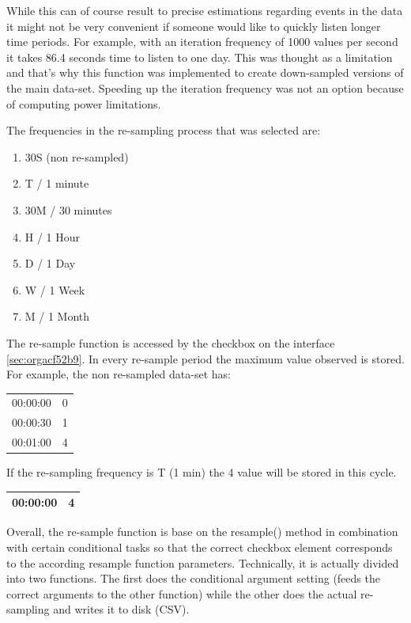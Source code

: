 \documentclass[11pt]{article}
\begin{document}
While this can of course result to precise estimations regarding events in the data it might not be very convenient if someone would like to quickly listen longer time periods.  For example, with an iteration frequency of 1000 values per second it takes 86.4 seconds time to listen to one day.  This was thought as a limitation and that's why this function was implemented to create down-sampled versions of the main data-set.  Speeding up the iteration frequency was not an option because of computing power limitations.

The frequencies in the re-sampling process that was selected are:
\begin{enumerate}
\item 30S (non re-sampled)
\item T / 1 minute
\item 30M / 30 minutes
\item H / 1 Hour
\item D / 1 Day
\item W / 1 Week
\item M / 1 Month
\end{enumerate}

The re-sample function is accessed by the checkbox on the interface \ref{sec:orgacf52b9}.  In every re-sample period the maximum value observed is stored.  For example, the non re-sampled data-set has:

\begin{center}
\begin{tabular}{rr}
\hline
00:00:00 & 0\\
00:00:30 & 1\\
00:01:00 & 4\\
\hline
\end{tabular}
\end{center}

If the re-sampling frequency is T (1 min) the 4 value will be stored in this cycle.

\begin{center}
\begin{tabular}{rr}
\hline
00:00:00 & 4\\
\hline
\end{tabular}
\end{center}

Overall, the re-sample function is base on the resample() method in combination with certain conditional tasks so that the correct checkbox element corresponds to the according resample function parameters.  Technically, it is actually divided into two functions.  The first does the conditional argument setting (feeds the correct arguments to the other function) while the other does the actual re-sampling and writes it to disk (CSV).
\end{document}
